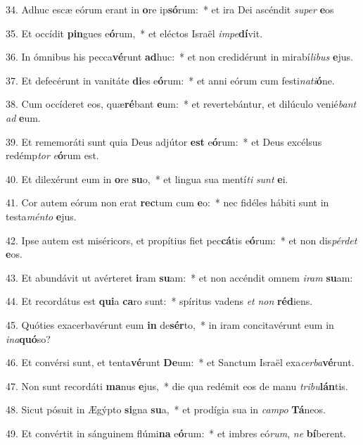 34. Adhuc escæ eórum erant in \textbf{o}re ip\textbf{só}rum:~*  et ira Dei ascéndit \textit{su}\textit{per} \textbf{e}os\

35. Et occídit \textbf{pin}gues e\textbf{ó}rum,~*  et eléctos Israël \textit{im}\textit{pe}\textbf{dí}vit.\

36. In ómnibus his pecca\textbf{vé}runt \textbf{ad}huc:~*  et non credidérunt in mirabí\textit{li}\textit{bus} \textbf{e}jus.\

37. Et defecérunt in vanitáte \textbf{di}es e\textbf{ó}rum:~*  et anni eórum cum festi\textit{na}\textit{ti}\textbf{ó}ne.\

38. Cum occíderet eos, quæ\textbf{ré}bant \textbf{e}um:~*  et revertebántur, et dilúculo venié\textit{bant} \textit{ad} \textbf{e}um.\

39. Et rememoráti sunt quia Deus adjútor \textbf{est} e\textbf{ó}rum:~*  et Deus excélsus redémp\textit{tor} \textit{e}\textbf{ó}rum est.\

40. Et dilexérunt eum in \textbf{o}re \textbf{su}o,~*  et lingua sua mentí\textit{ti} \textit{sunt} \textbf{e}i.\

41. Cor autem eórum non erat \textbf{rec}tum cum \textbf{e}o:~*  nec fidéles hábiti sunt in testa\textit{mén}\textit{to} \textbf{e}jus.\

42. Ipse autem est miséricors, et propítius fiet pec\textbf{cá}tis e\textbf{ó}rum:~*  et non dis\textit{pér}\textit{det} \textbf{e}os.\

43. Et abundávit ut avérteret \textbf{i}ram \textbf{su}am:~*  et non accéndit omnem \textit{i}\textit{ram} \textbf{su}am:\

44. Et recordátus est \textbf{qui}a \textbf{ca}ro sunt:~*  spíritus vadens \textit{et} \textit{non} \textbf{réd}iens.\

45. Quóties exacerbavérunt eum \textbf{in} de\textbf{sér}to,~*  in iram concitavérunt eum in \textit{in}\textit{a}\textbf{quó}so?\

46. Et convérsi sunt, et tenta\textbf{vé}runt \textbf{De}um:~*  et Sanctum Israël exa\textit{cer}\textit{ba}\textbf{vé}runt.\

47. Non sunt recordáti \textbf{ma}nus \textbf{e}jus,~*  die qua redémit eos de manu \textit{tri}\textit{bu}\textbf{lán}tis.\

48. Sicut pósuit in Ægýpto \textbf{si}gna \textbf{su}a,~*  et prodígia sua in \textit{cam}\textit{po} \textbf{Tá}neos.\

49. Et convértit in sánguinem flúmi\textbf{na} e\textbf{ó}rum:~*  et imbres eó\textit{rum}, \textit{ne} \textbf{bí}berent.\

